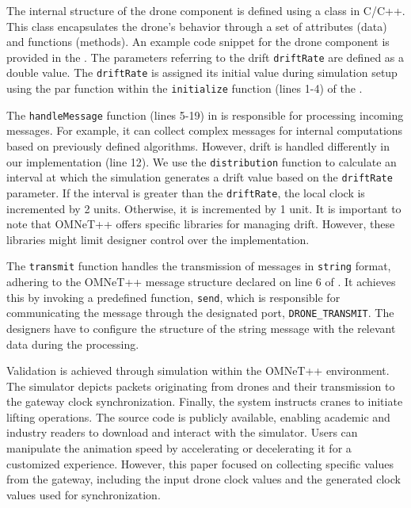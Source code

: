 The internal structure of the drone component is defined using a class in C/C++. This class encapsulates the drone's behavior through a set of attributes (data) and functions (methods). An example code snippet for the drone component is provided in the . The parameters referring to the drift \texttt{driftRate} are defined as a double value. The \texttt{driftRate} is assigned its initial value during simulation setup using the par function within the \texttt{initialize} function (lines 1-4) of the .

The \texttt{handleMessage} function (lines 5-19) in  is responsible for processing incoming messages. For example, it can collect complex messages for internal computations based on previously defined algorithms. However, drift is handled differently in our implementation (line 12). We use the \texttt{distribution} function to calculate an interval at which the simulation generates a drift value based on the \texttt{driftRate}  parameter. If the interval is greater than the \texttt{driftRate}, the local clock is incremented by 2 units. Otherwise, it is incremented by 1 unit. It is important to note that OMNeT++ offers specific libraries for managing drift. However, these libraries might limit designer control over the implementation.

The \texttt{transmit} function handles the transmission of messages in \texttt{string} format, adhering to the OMNeT++ message structure declared on line 6 of . It achieves this by invoking a predefined function, \texttt{send}, which is responsible for communicating the message through the designated port, \texttt{DRONE\_TRANSMIT}. The designers have to configure the structure of the string message with the relevant data during the processing.


Validation is achieved through simulation within the OMNeT++ environment. The simulator depicts packets originating from drones and their transmission to the gateway clock synchronization. Finally, the system instructs cranes to initiate lifting operations. The source code is publicly available, enabling academic and industry readers to download and interact with the simulator. Users can manipulate the animation speed by accelerating or decelerating it for a customized experience. However, this paper focused on collecting specific values from the gateway, including the input drone clock values and the generated clock values used for synchronization. 


